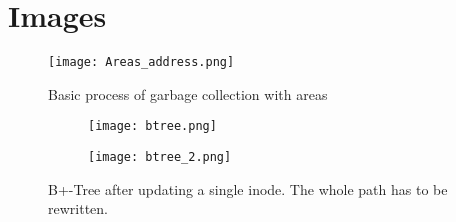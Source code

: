 \section{Images}

\begin{figure}[ht]
  \centering\texttt{[image: Areas\_address.png]}
  \caption{Basic process of garbage collection with areas}
  \label{fig:area_address}
\end{figure}

\begin{figure}[htp]
	\centering
	\begin{subfigure}[t]{.49\textwidth}
		\centering\texttt{[image: btree.png]}
	\end{subfigure}
	\begin{subfigure}[t]{.49\textwidth}
		\centering\texttt{[image: btree\_2.png]}
	\end{subfigure}
	\label{fig:btreewandering}
	\caption{B+-Tree after updating a single inode. The whole path has to be rewritten.}
\end{figure}


%
%
%
